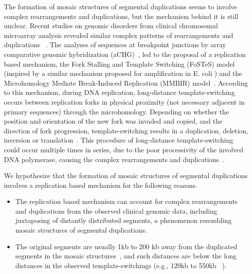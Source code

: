 \documentclass[12pt]{article}
\begin{document}
The formation of mosaic structures of segmental duplications seems to involve complex rearrangements and duplications, but the mechanism behind it is still unclear.
Recent studies on genomic disorders from clinical chromosomal microarray analysis revealed similar complex patterns of rearrangements and duplications ~\cite{lee2007dna,liu2011chromosome}. 
The analyses of sequences at breakpoint junctions by array comparative genomic hybridization (aCHG)~\cite{pinkel2005array}, 
led to the proposal of a replication based mechanism, 
the Fork Stalling and Template Switching (FoSTeS) model~\cite{lee2007dna} (inspired by a similar mechanism proposed for amplification in E. coli \cite{slack2006mechanism}) 
and the Microhomology Mediate Break-Induced Replication (MMBIR) model~\cite{hastings2009microhomology}. 
According to this mechanism, during DNA replication, 
long-distance template-switching occurs between replication forks in physical proximity (not necessary adjacent in primary sequences) through the microhomology.
Depending on whether the position and orientation of the new fork was invaded and copied, and the direction of fork progression, 
template-switching results in a duplication, deletion, inversion or translation~\cite{hastings2009microhomology}. 
This procedure of long-distance template-switching could occur multiple times in series, 
due to the poor processivity of the involved DNA polymerase, causing the complex rearrangements and duplications~\cite{gu2008mechanisms}.

     
We hypothesize that the formation of mosaic structures of segmental duplications involves a replication based mechanism for the following reasons.
\begin{itemize}
\item The replication based mechanism can account for complex rearrangements and duplications from the observed clinical genomic data, 
including juxtaposing of distantly distributed segments, a phenomenon resembling mosaic structures of segmental duplications.
\item The original segments are usually 1kb to 200 kb away from the duplicated segments in the mosaic structures~\cite{samonte2002segmental}, 
and such distances are below the long distances in the observed template-switchings (e.g., 120kb to 550kb ~\cite{gu2008mechanisms}).
\end{itemize}
\end{document}
